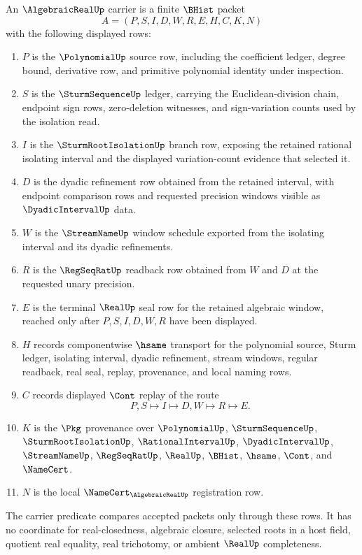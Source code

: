 \begin{definition}
\label{def:algebraic-real-carrier}
An $\AlgebraicRealUp$ carrier is a finite $\BHist$ packet
$$
A=(P,S,I,D,W,R,E,H,C,K,N)
$$
with the following displayed rows:
\begin{enumerate}
\item $P$ is the $\PolynomialUp$ source row, including the coefficient ledger, degree bound, derivative row, and primitive polynomial identity under inspection.
\item $S$ is the $\SturmSequenceUp$ ledger, carrying the Euclidean-division chain, endpoint sign rows, zero-deletion witnesses, and sign-variation counts used by the isolation read.
\item $I$ is the $\SturmRootIsolationUp$ branch row, exposing the retained rational isolating interval and the displayed variation-count evidence that selected it.
\item $D$ is the dyadic refinement row obtained from the retained interval, with endpoint comparison rows and requested precision windows visible as $\DyadicIntervalUp$ data.
\item $W$ is the $\StreamNameUp$ window schedule exported from the isolating interval and its dyadic refinements.
\item $R$ is the $\RegSeqRatUp$ readback row obtained from $W$ and $D$ at the requested unary precision.
\item $E$ is the terminal $\RealUp$ seal row for the retained algebraic window, reached only after $P,S,I,D,W,R$ have been displayed.
\item $H$ records componentwise $\hsame$ transport for the polynomial source, Sturm ledger, isolating interval, dyadic refinement, stream windows, regular readback, real seal, replay, provenance, and local naming rows.
\item $C$ records displayed $\Cont$ replay of the route
$$
P,S \longmapsto I \longmapsto D,W \longmapsto R \longmapsto E .
$$
\item $K$ is the $\Pkg$ provenance over $\PolynomialUp$, $\SturmSequenceUp$, $\SturmRootIsolationUp$, $\RationalIntervalUp$, $\DyadicIntervalUp$, $\StreamNameUp$, $\RegSeqRatUp$, $\RealUp$, $\BHist$, $\hsame$, $\Cont$, and $\NameCert$.
\item $N$ is the local $\NameCert_{\AlgebraicRealUp}$ registration row.
\end{enumerate}
The carrier predicate compares accepted packets only through these rows. It has no coordinate for real-closedness, algebraic closure, selected roots in a host field, quotient real equality, real trichotomy, or ambient $\RealUp$ completeness.
\end{definition}

